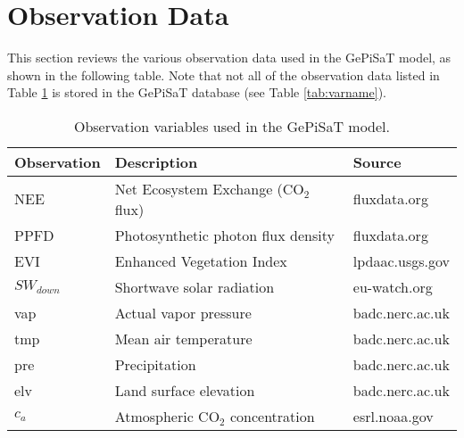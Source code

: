 \section{Observation Data}
\label{sec:obsdata}
This section reviews the various observation data used in the GePiSaT model, as shown in the following table.  
Note that not all of the observation data listed in Table \ref{tab:gepisatobs} is stored in the GePiSaT database (see Table \ref{tab:varname}).
\begin{table}[h]
    \caption{Observation variables used in the GePiSaT model.}
    \label{tab:gepisatobs}
    \centering
    \begin{tabular}{l l l}
        \hline
        \bf{Observation} & \bf{Description} & \bf{Source} \\
        \hline
         NEE & Net Ecosystem Exchange (CO$_2$ flux) & fluxdata.org \\ 
         PPFD & Photosynthetic photon flux density & fluxdata.org \\ 
         EVI & Enhanced Vegetation Index & lpdaac.usgs.gov \\ 
         $SW_{down}$ & Shortwave solar radiation &  eu-watch.org \\
         vap & Actual vapor pressure & badc.nerc.ac.uk \\
         tmp & Mean air temperature & badc.nerc.ac.uk \\
         pre & Precipitation & badc.nerc.ac.uk \\
         elv & Land surface elevation & badc.nerc.ac.uk \\
         $c_a$ & Atmospheric CO$_2$ concentration & esrl.noaa.gov \\
        \hline
    \end{tabular}
\end{table}

